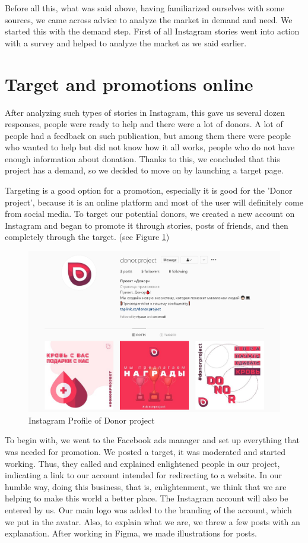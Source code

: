 \par
Before all this, what was said above, having familiarized ourselves with some sources, we came across advice to analyze the market in demand and need. We started this with the demand step. First of all Instagram stories went into action with a survey and helped to analyze the market as we said earlier. 

\section{Target and promotions online}

\par
After analyzing such types of stories in Instagram, this gave us several dozen responses, people were ready to help and there were a lot of donors. A lot of people had a feedback on such publication, but among them there were people who wanted to help but did not know how it all works, people who do not have enough information about donation. Thanks to this, we concluded that this project has a demand, so we decided to move on by launching a target page. 
\par
Targeting is a good option for a promotion, especially it is good for the 'Donor project', because it is an online platform and most of the user will definitely come from social media.
To target our potential donors, we created a new account on Instagram and began to promote it through stories, posts of friends, and then completely through the target. (see Figure \ref{fig:igaccount})
\begin{figure}[h]
    \centering
    \includegraphics[scale=0.25]{figures/7.png}
    \caption{Instagram Profile of Donor project}
    \label{fig:igaccount}
\end{figure}
\par
To begin with, we went to the Facebook ads manager and set up everything that was needed for promotion. We posted a target, it was moderated and started working. Thus, they called and explained enlightened people in our project, indicating a link to our account intended for redirecting to a website. In our humble way, doing this business, that is, enlightenment, we think that we are helping to make this world a better place.
The Instagram account will also be entered by us. Our main logo was added to the branding of the account, which we put in the avatar. Also, to explain what we are, we threw a few posts with an explanation. After working in Figma, we made illustrations for posts.

